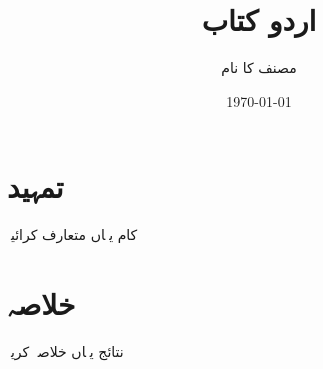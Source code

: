 \documentclass[11pt]{book}
\title{اردو کتاب}
\author{مصنف کا نام}
\date{\today}
\begin{document}
\maketitle
\tableofcontents

\chapter{تمہید}
کام یہاں متعارف کرائیںؔ

\chapter{خلاصہ}
نتائج یہاں خلاصہ کریںؔ
\end{document}
